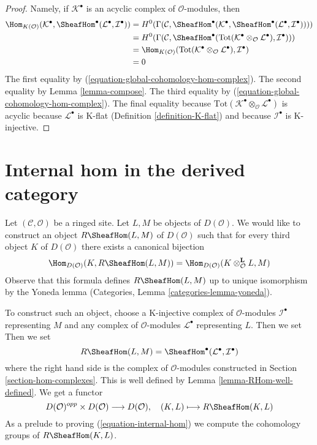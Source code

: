 \begin{proof}
Namely, if $\mathcal{K}^\bullet$ is an acyclic complex of
$\mathcal{O}$-modules, then
\begin{align*}
\Hom_{K(\mathcal{O})}(\mathcal{K}^\bullet,
\SheafHom^\bullet(\mathcal{L}^\bullet, \mathcal{I}^\bullet))
& =
H^0(\Gamma(\mathcal{C},
\SheafHom^\bullet(\mathcal{K}^\bullet,
\SheafHom^\bullet(\mathcal{L}^\bullet, \mathcal{I}^\bullet)))) \\
& =
H^0(\Gamma(\mathcal{C}, \SheafHom^\bullet(\text{Tot}(
\mathcal{K}^\bullet \otimes_\mathcal{O} \mathcal{L}^\bullet),
\mathcal{I}^\bullet))) \\
& =
\Hom_{K(\mathcal{O})}(
\text{Tot}(\mathcal{K}^\bullet \otimes_\mathcal{O} \mathcal{L}^\bullet),
\mathcal{I}^\bullet) \\
& =
0
\end{align*}
The first equality by (\ref{equation-global-cohomology-hom-complex}).
The second equality by Lemma \ref{lemma-compose}.
The third equality by (\ref{equation-global-cohomology-hom-complex}).
The final equality because
$\text{Tot}(\mathcal{K}^\bullet \otimes_\mathcal{O} \mathcal{L}^\bullet)$
is acyclic because $\mathcal{L}^\bullet$ is K-flat
(Definition \ref{definition-K-flat}) and because $\mathcal{I}^\bullet$
is K-injective.
\end{proof}








\section{Internal hom in the derived category}
\label{section-internal-hom}

\noindent
Let $(\mathcal{C}, \mathcal{O})$ be a ringed site. Let $L, M$ be objects
of $D(\mathcal{O})$. We would like to construct an object
$R\SheafHom(L, M)$ of $D(\mathcal{O})$ such that for every third
object $K$ of $D(\mathcal{O})$ there exists a canonical bijection
\begin{equation}
\label{equation-internal-hom}
\Hom_{D(\mathcal{O})}(K, R\SheafHom(L, M))
=
\Hom_{D(\mathcal{O})}(K \otimes_\mathcal{O}^\mathbf{L} L, M)
\end{equation}
Observe that this formula defines $R\SheafHom(L, M)$ up to unique
isomorphism by the Yoneda lemma
(Categories, Lemma \ref{categories-lemma-yoneda}).

\medskip\noindent
To construct such an object, choose a K-injective complex of
$\mathcal{O}$-modules $\mathcal{I}^\bullet$ representing $M$ and any
complex of $\mathcal{O}$-modules $\mathcal{L}^\bullet$ representing $L$.
Then we set
Then we set
$$
R\SheafHom(L, M) = \SheafHom^\bullet(\mathcal{L}^\bullet, \mathcal{I}^\bullet)
$$
where the right hand side is the complex of $\mathcal{O}$-modules
constructed in Section \ref{section-hom-complexes}.
This is well defined by Lemma \ref{lemma-RHom-well-defined}.
We get a functor
$$
D(\mathcal{O})^{opp} \times D(\mathcal{O}) \longrightarrow D(\mathcal{O}),
\quad
(K, L) \longmapsto R\SheafHom(K, L)
$$
As a prelude to proving (\ref{equation-internal-hom})
we compute the cohomology groups of $R\SheafHom(K, L)$.

